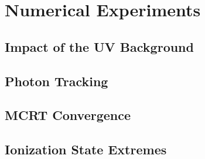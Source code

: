 \chapter{Numerical Experiments}
\label{sec:experiments}

\section{Impact of the UV Background}

\section{Photon Tracking}

\section{MCRT Convergence}

\section{Ionization State Extremes}
\label{sec:ionization_extremes}
